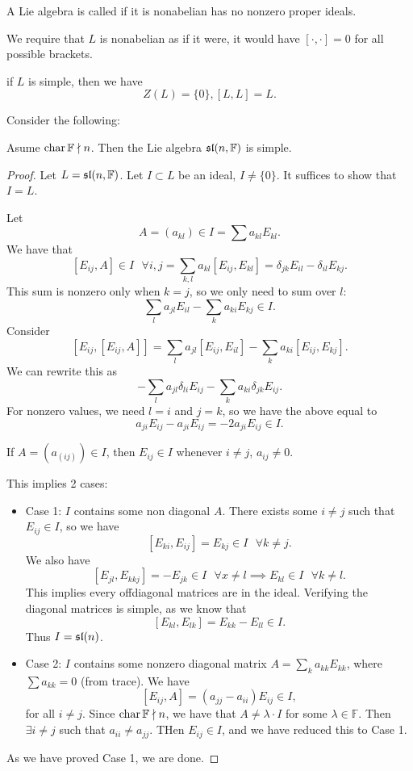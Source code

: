 \begin{definition}
A Lie algebra is called  if it is nonabelian has no nonzero proper ideals. 
\end{definition}
We require that $L$ is nonabelian as if it were, it would have $[\cdot,\cdot] = 0$ for all possible brackets. 
\begin{remark*}
if $L$ is simple, then we have 
\[ Z(L) = \{0\}, [L,L]=L. \] 
\end{remark*}

Consider the following: 
\begin{proposition}
Asume $\operatorname{char} \mathbb{F} \nmid n$. Then the Lie algebra $\frak{sl}(n, \mathbb{F})$ is simple.
\end{proposition}

\begin{proof}
Let $L = \frak{sl}(n, \mathbb{F})$. Let $I \subset L$ be an ideal, $I \neq \{0\}$. It suffices to show that $I=L$. 

Let 
\[ A = (a_{kl}) \in I = \sum a_{kl}E_{kl}. \] We have that 
\[ [E_{ij},A] \in I \text{ } \forall i,j  = \sum_{k,l} a_{kl} [E_{ij}, E_{kl}] = \delta_{jk}E_{il} - \delta_{il}E_{kj}. \] This sum is nonzero only when $k = j$, so we only need to sum over $l$: 
\[ \sum_{l} a_{jl}E_{il} - \sum_{k} a_{ki}E_{kj} \in I. \] Consider 
\[ [E_{ij}, [E_{ij}, A]] = \sum_l a_{jl}[E_{ij}, E_{il}] - \sum_k a_{ki}[E_{ij},E_{kj}]. \] We can rewrite this as 
\[ -\sum_l a_{jl}\delta_{li}E_{ij} - \sum_k a_{ki}\delta_{jk}E_{ij}. \] For nonzero values, we need $l=i$ and $j=k$, so we have the above equal to 
\[ a_{ji}E_{ij} - a_{ji}E_{ij} = -2a_{ji}E_{ij} \in I. \] 

If $A = (a_{(ij)}) \in I$, then $E_{ij} \in I$ whenever $i \neq j$, $a_{ij} \neq 0$. 

This implies 2 cases: 
\begin{itemize}
\item Case 1: $I$ contains some non diagonal $A$. There exists some $i \neq j$ such that $E_{ij} \in I$, so we have
\[ [E_{ki}, E_{ij}] = E_{kj} \in I \text{ } \forall k \neq j. \] We also have 
\[ [E_{jl}, E_{kkj}] = -E_{jk} \in I \text{ } \forall x \neq l \implies E_{kl} \in I \text{ } \forall k \neq l.\] This implies every offdiagonal matrices are in the ideal. Verifying the diagonal matrices is simple, as we know that 
\[ [E_{kl}, E_{lk}] = E_{kk} - E_{ll} \in I. \] Thus $I = \frak{sl}(n)$. 
\item Case 2: $I$ contains some nonzero diagonal matrix $A = \sum\limits_{k}a_{kk}E_{kk}$, where $\sum a_{kk} = 0$ (from trace). We have 
\[ [E_{ij}, A] = (a_{jj} - a_{ii}) E_{ij} \in I, \] for all $i \neq j$. Since $\operatorname{char} \mathbb{F} \nmid n$, we have that $A \neq \lambda \cdot I$ for some  $\lambda \in \mathbb{F}$. Then $\exists i \neq j$ such that $a_{ii} \neq a_{jj}$. THen $E_{ij} \in I$, and we have reduced this to Case 1. 
\end{itemize}
As we have proved Case 1, we are done. 
\end{proof}


